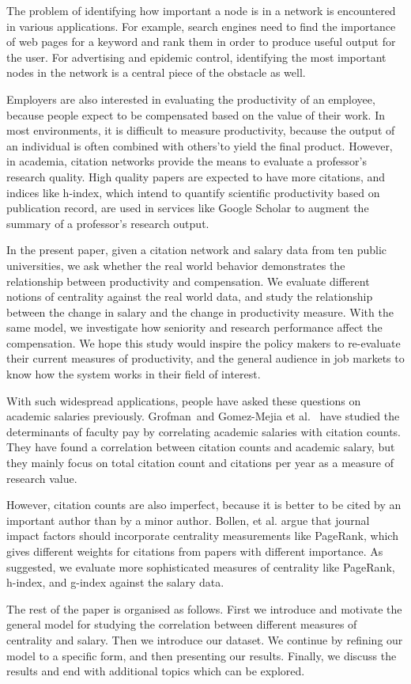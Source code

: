 The problem of identifying how important a node is in a network is encountered in various applications. For example, search engines need to find the importance of web pages for a keyword and rank them in order to produce useful output for the user. For advertising and epidemic control, identifying the most important nodes in the network is a central piece of the obstacle as well.

Employers are also interested in evaluating the productivity of an employee, because people expect to be compensated based on the value of their work. In most environments, it is difficult to measure productivity, because the output of an individual is often combined with others\textquoteright  to yield the final product. However, in academia, citation networks provide the means to evaluate a professor\textquoteright s research quality. High quality papers are expected to have more citations, and indices like h-index, which intend to quantify scientific productivity based on publication record, are used in services like Google Scholar to augment the summary of a professor\textquoteright s research output.

In the present paper, given a citation network and salary data from ten public universities, we ask whether the real world behavior demonstrates the relationship between productivity and compensation. We evaluate different notions of centrality against the real world data, and study the relationship between the change in salary and the change in productivity measure. With the same model, we investigate how seniority and research performance affect the compensation. We hope this study would inspire the policy makers to re-evaluate their current measures of productivity, and the general audience in job markets to know how the system works in their field of interest.

With such widespread applications, people have asked these questions on academic salaries previously. Grofman~\cite{grofman2009political}and Gomez-Mejia et al.~\cite{gomez1992} have studied the determinants of faculty pay by correlating academic salaries with citation counts. They have found a correlation between citation counts and academic salary, but they mainly focus on total citation count and citations per year as a measure of research value.

However, citation counts are also imperfect, because it is better to be cited by an important author than by a minor author. Bollen, et al. argue that journal impact factors should incorporate centrality measurements like PageRank, which gives different weights for citations from papers with different importance. As suggested, we evaluate more sophisticated measures of centrality like PageRank, h-index, and g-index against the salary data.

The rest of the paper is organised as follows. First we introduce and motivate the general model for studying the correlation between different measures of centrality and salary. Then we introduce our dataset. We continue by refining our model to a specific form, and then presenting our results. Finally, we discuss the results and end with additional topics which can be explored.
